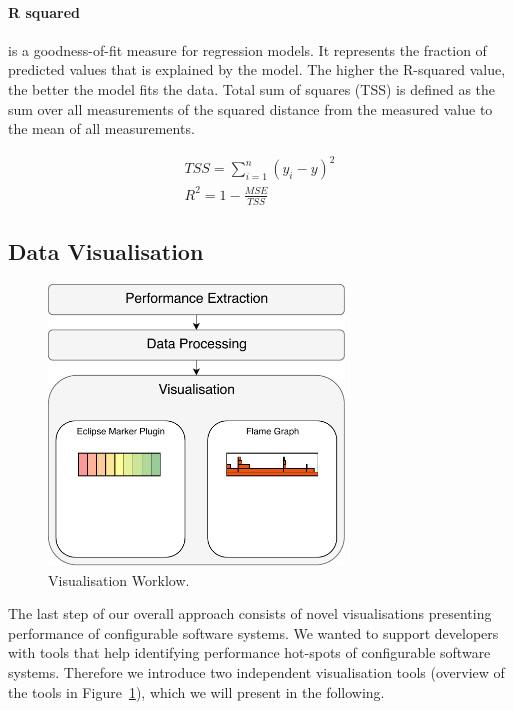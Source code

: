 \paragraph{R squared} 
is a goodness-of-fit measure for regression models. It represents the fraction of predicted values that is explained by the model. The higher the R-squared value, the better the model fits the data. Total sum of squares (TSS) is defined as the sum over all measurements of the squared distance from the measured value to the mean of all measurements.

\begin{equation}
    \begin{aligned}
        \label{def:RSS:ElNet}
        TSS=\sum_{i=1}^n(y_i-y)^2
        \\
        R^2=1-\frac{MSE}{TSS}
    \end{aligned}
\end{equation}


\subsection{Data Visualisation}
\label{visualisation}

\begin{figure}
  \centering
  \includegraphics[width=0.7\textwidth]{images/workflow_visual_expanded}
  \caption{Visualisation Worklow.}
  \label{data_vis_workflow}
\end{figure}

The last step of our overall approach consists of novel visualisations presenting performance of configurable software systems. We wanted to support developers with tools that help identifying performance hot-spots of configurable software systems. Therefore we introduce two independent visualisation tools (overview of the tools in Figure~\ref{data_vis_workflow}), which we will present in the following.

